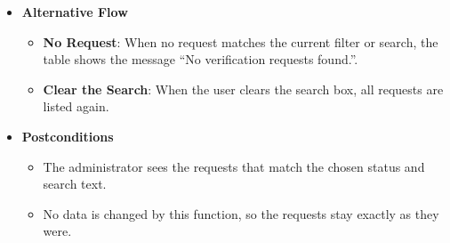 \begin{itemize}[leftmargin=1.6em,topsep=4pt,itemsep=3pt,parsep=0pt,label=$\bullet$]
\begin{itemize}[leftmargin=2.2em,topsep=2pt,itemsep=3pt,parsep=0pt,label=$\circ$]
\begin{itemize}[leftmargin=2.2em,topsep=2pt,itemsep=3pt,parsep=0pt,label=$\blacksquare$]
                    \item \textbf{Status}: The current status, shown as a badge with the labels Pending, Approved or Rejected.
                    \item \textbf{Submitted}: The date on which the document was submitted.
                \end{itemize}
            \item \textbf{Read the Status Colour}: A pending request is shown in amber, an approved request in green and a rejected request in red.
            \item \textbf{Filter by Status}: The user chooses one of the tabs \textbf{All}, \textbf{Pending}, \textbf{Approved} or \textbf{Rejected} to show only the requests with that status.
            \item \textbf{Search}: The user types a text in the search box with the placeholder ``Search by email or display name...'' and submits it, and only the matching requests are shown.
            \item \textbf{Move Between Pages}: When there is more than one page, the user uses the page numbers or the \textbf{Previous} and \textbf{Next} buttons at the bottom of the list.
            \item \textbf{Choose a Request}: The user opens the request with the view button (see \textbf{View ID Verification Request Detail}).
        \end{itemize}
    \item \textbf{Alternative Flow}
        \begin{itemize}[leftmargin=2.2em,topsep=2pt,itemsep=3pt,parsep=0pt,label=$\circ$]
            \item \textbf{No Request}: When no request matches the current filter or search, the table shows the message ``No verification requests found.''.
            \item \textbf{Clear the Search}: When the user clears the search box, all requests are listed again.
        \end{itemize}
    \item \textbf{Postconditions}
        \begin{itemize}[leftmargin=2.2em,topsep=2pt,itemsep=3pt,parsep=0pt,label=$\circ$]
            \item The administrator sees the requests that match the chosen status and search text.
            \item No data is changed by this function, so the requests stay exactly as they were.

\end{itemize}
\end{itemize}
